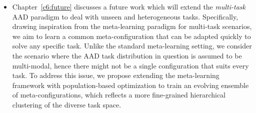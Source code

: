 \begin{itemize}
    \item Chapter~\ref{c6:future} discusses a future work which will extend the \emph{multi-task} AAD paradigm to deal with unseen and heterogeneous tasks. Specifically, drawing inspiration from the meta-learning paradigm for multi-task scenarios, we aim to learn a common meta-configuration that can be adapted quickly to solve any specific task. Unlike the standard meta-learning setting, we consider the scenario where the AAD task distribution in question is assumed to be multi-modal, hence there might not be a single configuration that suits every task. To address this issue, we propose extending the meta-learning framework with population-based optimization to train an evolving ensemble of meta-configurations, which reflects a more fine-grained hierarchical clustering of the diverse task space. 
\end{itemize}
